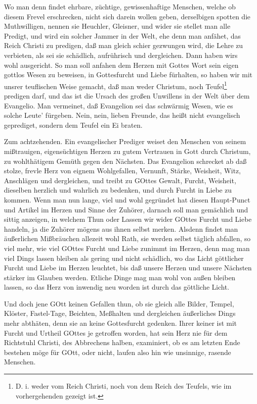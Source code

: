 Wo man denn findet ehrbare, züchtige, gewissenhaftige Menschen, welche ob diesem Frevel erschrecken, nicht sich darein wollen geben, derselbigen spotten die Muthwilligen, nennen sie Heuchler, Gleisner, und wider sie stellet man alle Predigt, und wird ein solcher Jammer in der Welt, ehe denn man anfähet, das Reich Christi zu predigen, daß man gleich schier gezwungen wird, die Lehre zu verbieten, als sei sie schädlich, aufrührisch und dergleichen. Dann haben wirs wohl ausgericht. So man soll anfahen dem Herzen mit Gottes Wort sein eigen gottlos Wesen zu beweisen, in Gottesfurcht und Liebe fürhalten, so haben wir mit unsrer teuflischen Weise gemacht, daß man weder Christum, noch Teufel\footnote{D. i. weder vom Reich Christi, noch von dem Reich des Teufels, wie im vorhergehenden gezeigt ist.} predigen darf, und das ist die Ursach des großen Unwillens in der Welt über dem Evangelio. Man vermeinet, daß Evangelion sei das schwärmig Wesen, wie es solche Leute' fürgeben. Nein, nein, lieben Freunde, das heißt nicht evangelisch geprediget, sondern dem Teufel ein Ei braten.

Zum achtzehenden. Ein evangelischer Prediger weiset den Menschen von seinem mißtrauigen, eigensüchtigen Herzen zu gutem Vertrauen in Gott durch Christum, zu wohlthätigem Gemüth gegen den Nächsten. Das Evangelion schrecket ab
daß stolze, frevle Herz von eignem Wohlgefallen, Vernunft, Stärke, Weisheit, Witz, Anschlägen und dergleichen, und treibt zu GOttes Gewalt, Furcht, Weisheit, dieselben herzlich und wahrlich zu bedenken, und durch Furcht in Liebe zu kommen. Wenn man nun lange, viel und wohl gegründet hat diesen Haupt-Punct und Artikel im Herzen und Sinne der Zuhörer, darnach soll man gemächlich und sittig anzeigen, in welchem Thun oder Lassen wir wider GOttes Furcht und Liebe handeln, ja die Zuhörer mögens aus ihnen selbst merken. Alsdenn findet man äußerlichen Mißbräuchen allezeit wohl Rath, sie werden selbst täglich abfallen, so viel mehr, wie viel GOttes Furcht und Liebe zunimmt im Herzen, denn mag man viel Dings lassen bleiben als gering und nicht schädlich, wo das Licht göttlicher Furcht und Liebe im Herzen leuchtet, bis daß unsere Herzen und unsere Nächsten stärker im Glauben werden. Etliche Dinge mag man wohl von außen bleiben lassen, so das Herz von inwendig neu worden ist durch das göttliche Licht.

Und doch jene GOtt keinen Gefallen thun, ob sie gleich alle Bilder, Tempel, Klöster, Fastel-Tage, Beichten, Meßhalten und dergleichen äußerliches Dings mehr abthäten, denn sie an keine Gottesfurcht gedenken. Ihrer keiner ist mit Furcht und Urtheil GOttes je getroffen worden, hat sein Herz nie für dem Richtstuhl Christi, des Abbrechens halben, examiniert, ob es am letzten Ende bestehen möge für GOtt, oder nicht, laufen also hin wie unsinnige, rasende Menschen.

